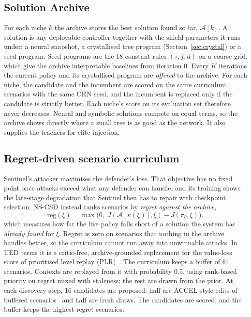 \subsection{Solution Archive}
\label{sec:archive}
For each niche $k$ the archive stores the best solution found so far,
$\mathcal{A}[k]$. A solution is any deployable controller together with the
shield parameters it runs under: a neural snapshot, a crystallised tree
program (Section~\ref{sec:crystal}) or a seed program. Seed programs are the
18 constant rules $(\tau,f,d)$ on a coarse grid, which give the archive
interpretable baselines from iteration 0. Every $K$ iterations the current
policy and its crystallised program are \emph{offered} to the archive. For each
niche, the candidate and the incumbent are scored on the same curriculum
scenarios with the same CRN seed, and the incumbent is replaced only if the
candidate is strictly better. Each niche's score on its evaluation set
therefore never decreases. Neural and symbolic solutions compete on equal
terms, so the archive shows directly where a small tree is as good as the
network. It also supplies the teachers for elite injection.

\subsection{Regret-driven scenario curriculum}
\label{sec:curriculum}
Sentinel's attacker maximises the defender's loss. That objective has no
fixed point once attacks exceed what any defender can handle, and its
training shows the late-stage degradation that Sentinel then has to repair
with checkpoint selection. NS-CSD instead ranks scenarios by \emph{regret
against the archive},
\begin{equation}
\mathrm{reg}(\xi)=\max\big(0,\;J(\mathcal{A}[\kappa(\xi)],\xi)-J(\pi_\theta,\xi)\big),
\label{eq:regret}
\end{equation}
which measures how far the live policy falls short of a solution the system
has \emph{already found} for $\xi$. Regret is zero on scenarios that nothing in
the archive handles better, so the curriculum cannot run away into unwinnable
attacks. In UED terms it is a critic-free, archive-grounded replacement for
the value-loss score of prioritised level replay
(PLR)~\cite{jiang2021plr,jiang2021robustplr}. The curriculum keeps a buffer of
64 scenarios. Contexts are replayed from it with probability $0.5$, using
rank-based priority on regret mixed with staleness; the rest are drawn from
the prior. At each discovery step, 16 candidates are proposed: half are
ACCEL-style edits of buffered scenarios~\cite{parkerholder2022accel} and half
are fresh draws. The candidates are scored, and the buffer keeps the
highest-regret scenarios.

